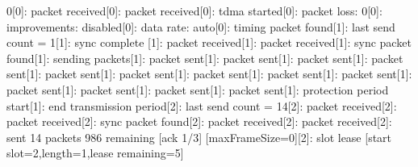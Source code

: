 \documentclass[parskip]{cs4rep}
\begin{document}
0[0]: packet received[0]: packet received[0]: tdma started[0]: packet loss: 0[0]: improvements: disabled[0]: data rate: auto[0]: timing packet found[1]: last send count = 1[1]: sync complete\newline
{}[1]: packet received[1]: packet received[1]: sync packet found[1]: sending packets[1]: packet sent[1]: packet sent[1]: packet sent[1]: packet sent[1]: packet sent[1]: packet sent[1]: packet sent[1]: packet sent[1]: packet sent[1]: packet sent[1]: packet sent[1]: packet sent[1]: packet sent[1]: protection period start[1]: end transmission period[2]: last send count = 14[2]: packet received[2]: packet received[2]: sync packet found[2]: packet received[2]: packet received[2]: sent 14 packets 986 remaining [ack 1/3] [maxFrameSize=0][2]: slot lease [start slot=2,length=1,lease remaining=5]\newline
\end{document}
